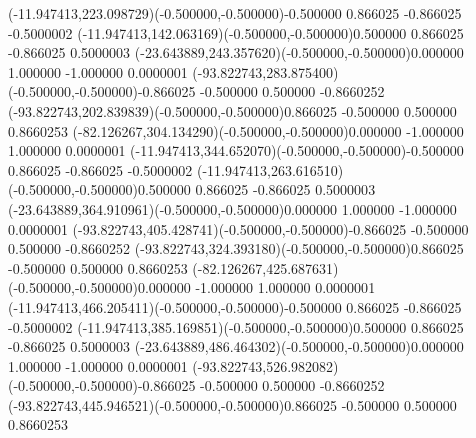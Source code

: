 \color{ASYcolor}
\fontsize{12.000000}{14.400000}\selectfont
\ASYalignT(-11.947413,223.098729)(-0.500000,-0.500000){-0.500000 0.866025 -0.866025 -0.500000}{2}%
\color{ASYcolor}
\fontsize{12.000000}{14.400000}\selectfont
\ASYalignT(-11.947413,142.063169)(-0.500000,-0.500000){0.500000 0.866025 -0.866025 0.500000}{3}%
\color{ASYcolor}
\fontsize{12.000000}{14.400000}\selectfont
\ASYalignT(-23.643889,243.357620)(-0.500000,-0.500000){0.000000 1.000000 -1.000000 0.000000}{1}%
\color{ASYcolor}
\fontsize{12.000000}{14.400000}\selectfont
\ASYalignT(-93.822743,283.875400)(-0.500000,-0.500000){-0.866025 -0.500000 0.500000 -0.866025}{2}%
\color{ASYcolor}
\fontsize{12.000000}{14.400000}\selectfont
\ASYalignT(-93.822743,202.839839)(-0.500000,-0.500000){0.866025 -0.500000 0.500000 0.866025}{3}%
\color{ASYcolor}
\fontsize{12.000000}{14.400000}\selectfont
\ASYalignT(-82.126267,304.134290)(-0.500000,-0.500000){0.000000 -1.000000 1.000000 0.000000}{1}%
\color{ASYcolor}
\fontsize{12.000000}{14.400000}\selectfont
\ASYalignT(-11.947413,344.652070)(-0.500000,-0.500000){-0.500000 0.866025 -0.866025 -0.500000}{2}%
\color{ASYcolor}
\fontsize{12.000000}{14.400000}\selectfont
\ASYalignT(-11.947413,263.616510)(-0.500000,-0.500000){0.500000 0.866025 -0.866025 0.500000}{3}%
\color{ASYcolor}
\fontsize{12.000000}{14.400000}\selectfont
\ASYalignT(-23.643889,364.910961)(-0.500000,-0.500000){0.000000 1.000000 -1.000000 0.000000}{1}%
\color{ASYcolor}
\fontsize{12.000000}{14.400000}\selectfont
\ASYalignT(-93.822743,405.428741)(-0.500000,-0.500000){-0.866025 -0.500000 0.500000 -0.866025}{2}%
\color{ASYcolor}
\fontsize{12.000000}{14.400000}\selectfont
\ASYalignT(-93.822743,324.393180)(-0.500000,-0.500000){0.866025 -0.500000 0.500000 0.866025}{3}%
\color{ASYcolor}
\fontsize{12.000000}{14.400000}\selectfont
\ASYalignT(-82.126267,425.687631)(-0.500000,-0.500000){0.000000 -1.000000 1.000000 0.000000}{1}%
\color{ASYcolor}
\fontsize{12.000000}{14.400000}\selectfont
\ASYalignT(-11.947413,466.205411)(-0.500000,-0.500000){-0.500000 0.866025 -0.866025 -0.500000}{2}%
\color{ASYcolor}
\fontsize{12.000000}{14.400000}\selectfont
\ASYalignT(-11.947413,385.169851)(-0.500000,-0.500000){0.500000 0.866025 -0.866025 0.500000}{3}%
\color{ASYcolor}
\fontsize{12.000000}{14.400000}\selectfont
\ASYalignT(-23.643889,486.464302)(-0.500000,-0.500000){0.000000 1.000000 -1.000000 0.000000}{1}%
\color{ASYcolor}
\fontsize{12.000000}{14.400000}\selectfont
\ASYalignT(-93.822743,526.982082)(-0.500000,-0.500000){-0.866025 -0.500000 0.500000 -0.866025}{2}%
\color{ASYcolor}
\fontsize{12.000000}{14.400000}\selectfont
\ASYalignT(-93.822743,445.946521)(-0.500000,-0.500000){0.866025 -0.500000 0.500000 0.866025}{3}%
